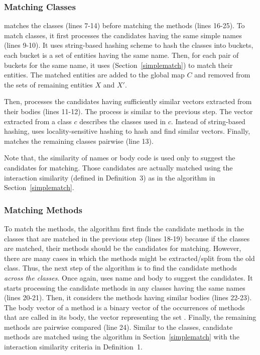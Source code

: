\subsubsection{Matching Classes}

{\tool} matches the classes (lines 7-14) before matching the methods
(lines 16-25). To match classes, it first processes the candidates
having the same simple names (lines 9-10). It uses string-based
hashing scheme to hash the classes into buckets, each bucket is a
set of entities having the same name. Then, for each pair of buckets
for the same name, it uses 
(Section~\ref{simplematch}) to match their entities. The matched
entities are added to the global map $C$ and removed from the sets of
remaining entities $X$ and $X'$.

Then, {\tool} processes the candidates having sufficiently similar
vectors extracted from their bodies (lines 11-12). The process is
similar to the previous step. The vector extracted from a class $c$
describes the classes used in $c$. Instead of string-based hashing,
{\tool} uses locality-sensitive hashing to hash and find similar
vectors. Finally, {\tool} matches the remaining classes pairwise (line
13).

Note that, the similarity of names or body code is used only to
suggest the candidates for matching. Those candidates are actually
matched using the interaction similarity (defined in Definition~3) as
in the algorithm in Section~\ref{simplematch}.

\subsubsection{Matching Methods}

To match the methods, the algorithm first finds the candidate methods
in the classes that are matched in the previous step (lines 18-19)
because if the classes are matched, their methods should be the
candidates for matching. However, there are many cases in which the
methods might be extracted/split from the old class. Thus, the next
step of the algorithm is to find the candidate methods {\em across the
classes}. Once again, {\tool} uses name and body to suggest the
candidates. It starts processing the candidate methods in any classes
having the same names (lines 20-21). Then, it considers the methods
having similar bodies (lines 22-23). The body vector of a method is a
binary vector of the occurrences of methods that are called in its
body, \ie the vector representing the set . Finally, the
remaining methods are pairwise compared (line 24). Similar to the
classes, candidate methods are matched using the algorithm in
Section~\ref{simplematch} with the interaction similarity criteria in
Definition~1.

